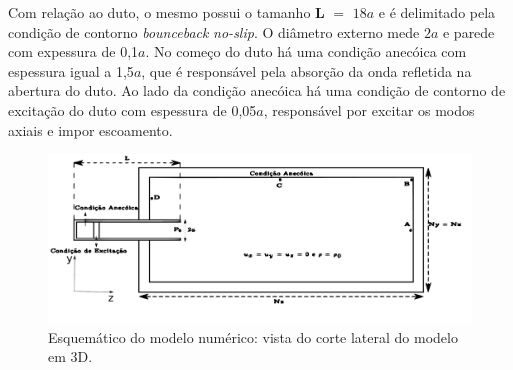 Com relação ao duto, o mesmo possui o tamanho \textbf{L} $=$ $18a$ e é delimitado pela condição de contorno \textit{bounceback} \textit{no-slip}. O diâmetro externo mede $2a$ e parede com expessura de 0,1$a$. No começo do duto há uma condição anecóica com espessura igual a 1,5$a$, que é responsável pela absorção da onda refletida na abertura do duto. Ao lado da condição anecóica há uma condição de contorno de excitação do duto com espessura de 0,05$a$, responsável por excitar os modos axiais e impor escoamento.    


\begin{figure}[ht!]
\centering
  \includegraphics[width=1.\linewidth]{figuras/modelo_numerico_3.pdf}
  \caption[Esquemático do modelo numérico]{Esquemático do modelo numérico: vista do corte lateral do modelo em 3D.}
  \label{fig:modelo}
\end{figure}


